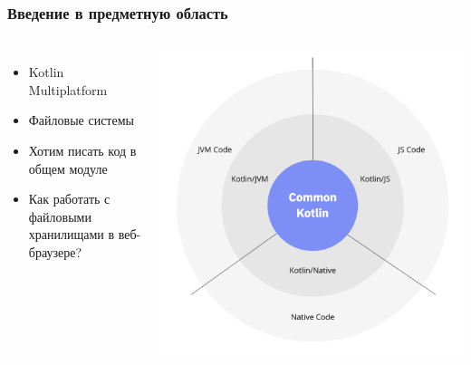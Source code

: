 \documentclass[14pt,aspectratio=169,hyperref={pdftex,unicode},xcolor=dvipsnames]{beamer}
\begin{document}
\begin{frame}
\frametitle{Введение в предметную область}


\begin{columns}
    \begin{itemize}
    \item Kotlin Multiplatform
    \item Файловые системы
    \item Хотим писать код в общем модуле
    \item Как работать с файловыми хранилищами в веб-браузере?
    \end{itemize}
    
    \centering
    \includegraphics[width=1.07\textwidth,keepaspectratio]{kotlin-multiplatform}
 \end{columns} 
\end{frame}
\end{document}
